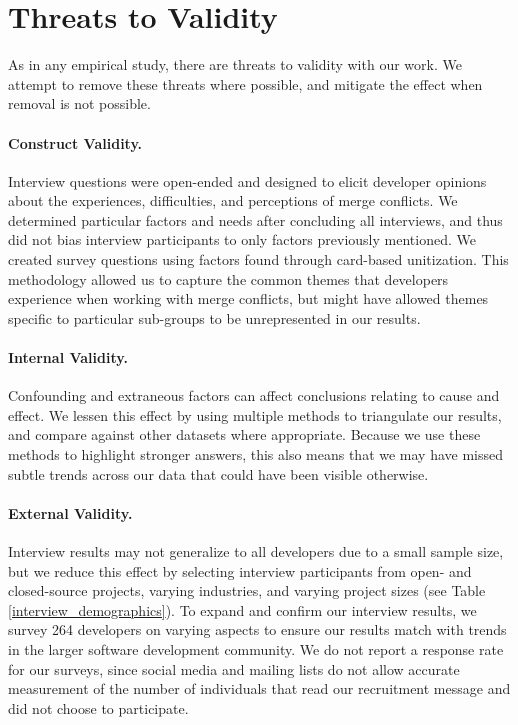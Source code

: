 \section{Threats to Validity}\label{threats}
As in any empirical study, there are threats to validity with our work.
We attempt to remove these threats where possible, and mitigate the effect when removal is not possible.

\paragraph{Construct Validity.}
Interview questions were open-ended and designed to elicit developer opinions about the experiences, difficulties, and perceptions of merge conflicts.
We determined particular factors and needs after concluding all interviews, and thus did not bias interview participants to only factors previously mentioned.
We created survey questions using factors found through card-based unitization.
This methodology allowed us to capture the common themes that developers experience when working with merge conflicts, but might have allowed themes specific to particular sub-groups to be unrepresented in our results.

\paragraph{Internal Validity.}
Confounding and extraneous factors can affect conclusions relating to cause and effect.
We lessen this effect by using multiple methods to triangulate our results, and compare against other datasets where appropriate.
Because we use these methods to highlight stronger answers, this also means that we may have missed subtle trends across our data that could have been visible otherwise.

\paragraph{External Validity.}
Interview results may not generalize to all developers due to a small sample size, but we reduce this effect by selecting interview participants from open- and closed-source projects, varying industries, and varying project sizes (see Table \ref{interview_demographics}).
To expand and confirm our interview results, we survey 264 developers on varying aspects to ensure our results match with trends in the larger software development community.
We do not report a response rate for our surveys, since social media and mailing lists do not allow accurate measurement of the number of individuals that read our recruitment message and did not choose to participate.

